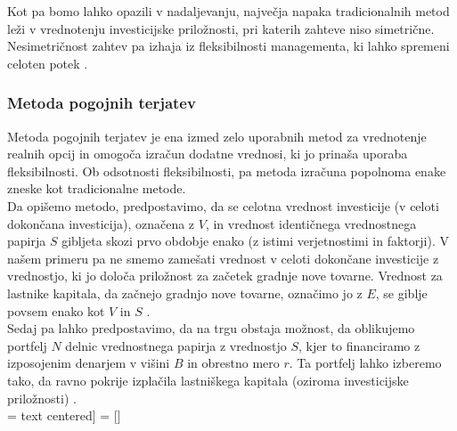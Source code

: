 \documentclass[12pt, a4paper]{amsart}
\theoremstyle{definition} %
\theoremstyle{plain} %
\begin{document}
Kot pa bomo lahko opazili v nadaljevanju, največja napaka tradicionalnih metod leži v vrednotenju investicijske priložnosti, pri katerih zahteve niso simetrične. Nesimetričnost zahtev pa izhaja iz fleksibilnosti managementa, ki lahko spremeni celoten potek \cite[str. 155]{Trigeorgis}. \\

\subsubsection{Metoda pogojnih terjatev}
Metoda pogojnih terjatev je ena izmed zelo uporabnih metod za vrednotenje realnih opcij in omogoča izračun dodatne vrednosi, ki jo prinaša uporaba fleksibilnosti. Ob odsotnosti fleksibilnosti, pa metoda izračuna popolnoma enake zneske kot tradicionalne metode.  \\
Da opišemo metodo, predpostavimo, da se celotna vrednost investicije (v celoti dokončana investicija), označena z $V$, in vrednost identičnega vrednostnega papirja $S$ gibljeta skozi prvo obdobje enako (z istimi verjetnostimi in faktorji). V našem primeru pa ne smemo zamešati vrednost v celoti dokončane investicije z vrednostjo, ki jo določa priložnost za začetek gradnje nove tovarne. Vrednost za lastnike kapitala, da začnejo gradnjo nove tovarne, označimo jo z $E$, se giblje povsem enako kot $V$ in $S$  \cite[str. 155, 156]{Trigeorgis}.\\
Sedaj pa lahko predpostavimo, da na trgu obstaja možnost, da oblikujemo portfelj $N$ delnic vrednostnega papirja z vrednostjo $S$, kjer to financiramo z izposojenim denarjem v višini $B$ in obrestno mero $r$. Ta portfelj lahko izberemo tako, da ravno pokrije izplačila lastniškega kapitala (oziroma investicijske priložnosti) \cite[str. 156]{Trigeorgis}. \\


 =  text centered]
 = []
\\[0,5 cm]
\end{document}
